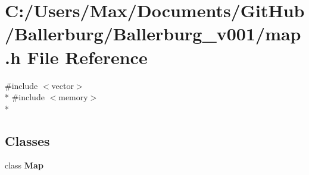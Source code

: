 \section{C\+:/\+Users/\+Max/\+Documents/\+Git\+Hub/\+Ballerburg/\+Ballerburg\+\_\+v001/map.h File Reference}
\label{map_8h}
{\ttfamily \#include $<$vector$>$}\\*
{\ttfamily \#include $<$memory$>$}\\*
\subsection*{Classes}
\begin{DoxyCompactItemize}
\item 
class {\bf Map}
\end{DoxyCompactItemize}
